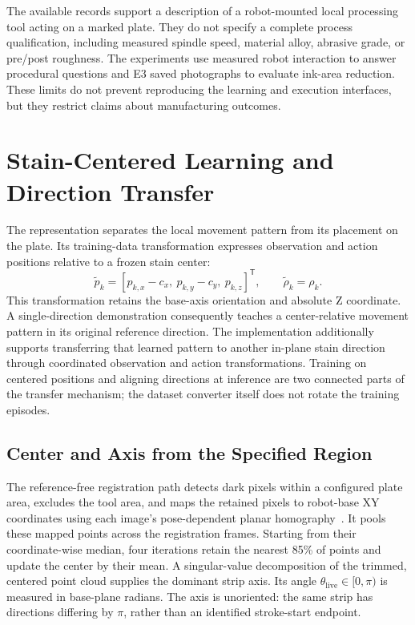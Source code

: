 The available records support a description of a robot-mounted local processing tool acting on a marked plate. They do not specify a complete process qualification, including measured spindle speed, material alloy, abrasive grade, or pre/post roughness. The experiments use measured robot interaction to answer procedural questions and E3 saved photographs to evaluate ink-area reduction. These limits do not prevent reproducing the learning and execution interfaces, but they restrict claims about manufacturing outcomes.

\section{Stain-Centered Learning and Direction Transfer}
\label{sec:stain_relative_generalization}
The representation separates the local movement pattern from its placement on the plate. Its training-data transformation expresses observation and action positions relative to a frozen stain center:
\begin{equation}
 \widetilde p_k=[p_{k,x}-c_x,\ p_{k,y}-c_y,\ p_{k,z}]^\mathsf{T},
 \qquad \widetilde\rho_k=\rho_k.
 \label{eq:relative_task_pose}
\end{equation}
This transformation retains the base-axis orientation and absolute Z coordinate. A single-direction demonstration consequently teaches a center-relative movement pattern in its original reference direction. The implementation additionally supports transferring that learned pattern to another in-plane stain direction through coordinated observation and action transformations. Training on centered positions and aligning directions at inference are two connected parts of the transfer mechanism; the dataset converter itself does not rotate the training episodes.

\subsection{Center and Axis from the Specified Region}
The reference-free registration path detects dark pixels within a configured plate area, excludes the tool area, and maps the retained pixels to robot-base XY coordinates using each image's pose-dependent planar homography~\cite{hartley2004multiple}. It pools these mapped points across the registration frames. Starting from their coordinate-wise median, four iterations retain the nearest 85\% of points and update the center by their mean. A singular-value decomposition of the trimmed, centered point cloud supplies the dominant strip axis. Its angle \(\theta_{\mathrm{live}}\in[0,\pi)\) is measured in base-plane radians. The axis is unoriented: the same strip has directions differing by \(\pi\), rather than an identified stroke-start endpoint.

